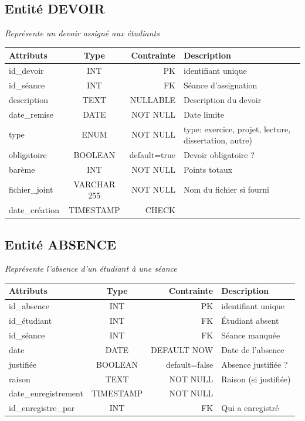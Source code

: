 \subsection{Entité DEVOIR}

\textit{Représente un devoir assigné aux étudiants}
\begin{center}
   \begin{tabular}{|l|c|r|a|}
  \hline
  \textbf{Attributs} & \textbf{Type} & \textbf{Contrainte} & \textbf{Description} \\
  \hline
  id\_devoir & INT & PK & identifiant unique \\
  \hline
  id\_séance & INT & FK &  Séance d'assignation \\
  \hline
  description & TEXT & NULLABLE & Description du devoir \\
  \hline
  date\_remise & DATE & NOT NULL & Date limite \\
  \hline
  type & ENUM & NOT NULL & type: exercice, projet, lecture, dissertation, autre) \\
  \hline
  obligatoire & BOOLEAN & default=true &  Devoir obligatoire ? \\
  \hline
  barème & INT & NOT NULL & Points totaux \\
  \hline
  fichier\_joint & VARCHAR 255 & NOT NULL & Nom du fichier si fourni \\
  \hline
  date\_création & TIMESTAMP & CHECK \\
  \hline
\end{tabular} 
\end{center}


\subsection{Entité ABSENCE}

\textit{Représente l'absence d'un étudiant à une séance}
\begin{center}
    \begin{tabular}{|l|c|r|a|}
  \hline
  \textbf{Attributs} & \textbf{Type} & \textbf{Contrainte} & \textbf{Description} \\
  \hline
  id\_absence & INT & PK & identifiant unique \\
  \hline
  id\_étudiant & INT & FK & Étudiant absent\\
  \hline
  id\_séance & INT & FK & Séance manquée\\
  \hline
  date & DATE & DEFAULT NOW & Date de l'absence\\
  \hline
  justifiée & BOOLEAN & default=false &  Absence justifiée ? \\
\hline
raison & TEXT & NOT NULL & Raison (si justifiée)\\
\hline
date\_enregistrement & TIMESTAMP & NOT NULL &\\
\hline
id\_enregistre\_par & INT & FK & Qui a enregistré \\
\hline
  \end{tabular}
\end{center}


